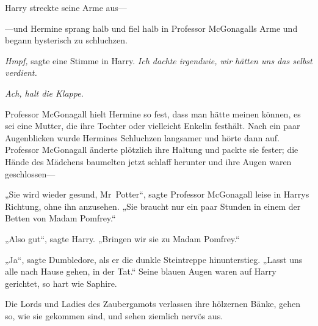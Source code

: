 Harry streckte seine Arme aus—

—und Hermine sprang halb und fiel halb in Professor McGonagalls Arme und begann hysterisch zu schluchzen.

\emph{Hmpf,} sagte eine Stimme in Harry. \emph{Ich dachte irgendwie, wir hätten uns das selbst verdient.}

\emph{Ach, halt die Klappe.}

Professor McGonagall hielt Hermine so fest, dass man hätte meinen können, es sei eine Mutter, die ihre Tochter oder vielleicht Enkelin festhält. Nach ein paar Augenblicken wurde Hermines Schluchzen langsamer und hörte dann auf. Professor McGonagall änderte plötzlich ihre Haltung und packte sie fester; die Hände des Mädchens baumelten jetzt schlaff herunter und ihre Augen waren geschlossen—

„Sie wird wieder gesund, Mr~Potter“, sagte Professor McGonagall leise in Harrys Richtung, ohne ihn anzusehen. „Sie braucht nur ein paar Stunden in einem der Betten von Madam Pomfrey.“

„Also gut“, sagte Harry. „Bringen wir sie zu Madam Pomfrey.“

„Ja“, sagte Dumbledore, als er die dunkle Steintreppe hinunterstieg. „Lasst uns alle nach Hause gehen, in der Tat.“
Seine blauen Augen waren auf Harry gerichtet, so hart wie Saphire.

\later

Die Lords und Ladies des Zaubergamots verlassen ihre hölzernen Bänke, gehen so, wie sie gekommen sind, und sehen ziemlich nervös aus.

